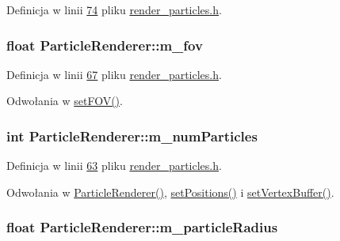 Definicja w linii \hyperlink{render__particles_8h_source_l00074}{74} pliku \hyperlink{render__particles_8h_source}{render\-\_\-particles.\-h}.

\hypertarget{class_particle_renderer_a0aed003bd557a3c32ca7d2ca89fc59f7}{
\subsubsection[{m\-\_\-fov}]{\setlength{\rightskip}{0pt plus 5cm}float Particle\-Renderer\-::m\-\_\-fov\hspace{0.3cm}{\ttfamily [protected]}}}\label{class_particle_renderer_a0aed003bd557a3c32ca7d2ca89fc59f7}


Definicja w linii \hyperlink{render__particles_8h_source_l00067}{67} pliku \hyperlink{render__particles_8h_source}{render\-\_\-particles.\-h}.



Odwołania w \hyperlink{render__particles_8h_source_l00046}{set\-F\-O\-V()}.

\hypertarget{class_particle_renderer_af885fdb5e6da925209dfd960f66b5fd8}{
\subsubsection[{m\-\_\-num\-Particles}]{\setlength{\rightskip}{0pt plus 5cm}int Particle\-Renderer\-::m\-\_\-num\-Particles\hspace{0.3cm}{\ttfamily [protected]}}}\label{class_particle_renderer_af885fdb5e6da925209dfd960f66b5fd8}


Definicja w linii \hyperlink{render__particles_8h_source_l00063}{63} pliku \hyperlink{render__particles_8h_source}{render\-\_\-particles.\-h}.



Odwołania w \hyperlink{render__particles_8cpp_source_l00025}{Particle\-Renderer()}, \hyperlink{render__particles_8cpp_source_l00042}{set\-Positions()} i \hyperlink{render__particles_8cpp_source_l00048}{set\-Vertex\-Buffer()}.

\hypertarget{class_particle_renderer_aab5ee3cd769a64c45dc9714aabdb0ee2}{
\subsubsection[{m\-\_\-particle\-Radius}]{\setlength{\rightskip}{0pt plus 5cm}float Particle\-Renderer\-::m\-\_\-particle\-Radius\hspace{0.3cm}{\ttfamily [protected]}}}\label{class_particle_renderer_aab5ee3cd769a64c45dc9714aabdb0ee2}


